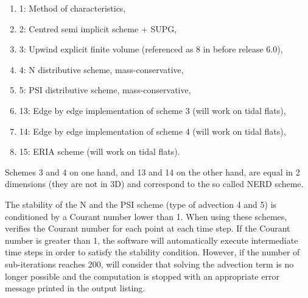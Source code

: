 \begin{enumerate}
\item[\nonumber]  1: Method of characteristics,

\item [\nonumber]  2: Centred semi implicit scheme + SUPG,

\item[\nonumber]   3:  Upwind explicit finite volume (referenced as 8 in before release 6.0),

\item [\nonumber]  4: N distributive scheme, mass-conservative,

\item [\nonumber]  5:  PSI distributive scheme, mass-conservative,
%

\item [\nonumber]  13: Edge by edge implementation of scheme 3 (will work on tidal flats),

\item [\nonumber]  14: Edge by edge implementation of scheme 4 (will work on tidal flats),

\item [\nonumber] 15: ERIA scheme (will work on tidal flats). 
\end{enumerate}

 Schemes 3 and 4 on one hand, and 13 and 14 on the other hand, are equal in 2 dimensions (they are not in 3D) and correspond to the so called NERD scheme.

 The stability of the N and the PSI scheme (type of advection 4 and 5) is conditioned by a Courant number lower than 1. When using these schemes,  verifies the Courant number for each point at each time step. If the Courant number is greater than 1, the software will automatically execute intermediate time steps in order to satisfy the stability condition. However, if the number of sub-iterations reaches 200,  will consider that solving the advection term is no longer possible and the computation is stopped with an appropriate error message printed in the output listing.

